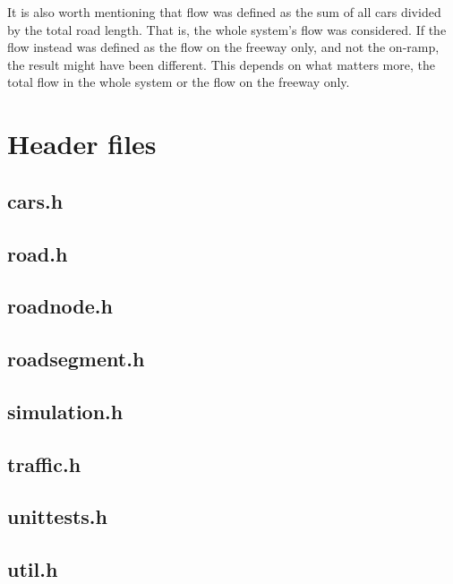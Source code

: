 \documentclass{article}
\begin{document}
    It is also worth mentioning that flow was defined as the sum of all cars divided
    by the total road length. That is, the whole system's flow was considered.
    If the flow instead was defined as the flow on the freeway only, and not the
    on-ramp, the result might have been different. This depends on what matters more,
    the total flow in the whole system or the flow on the freeway only.
\printbibliography
\pagebreak
\appendix

\section{Header files}
  \subsection{cars.h}
    
  \subsection{road.h}
    
  \subsection{roadnode.h}
    
  \subsection{roadsegment.h}
    
  \subsection{simulation.h}
    
  \subsection{traffic.h}
    
  \subsection{unittests.h}
    
  \subsection{util.h}
    
\end{document}
